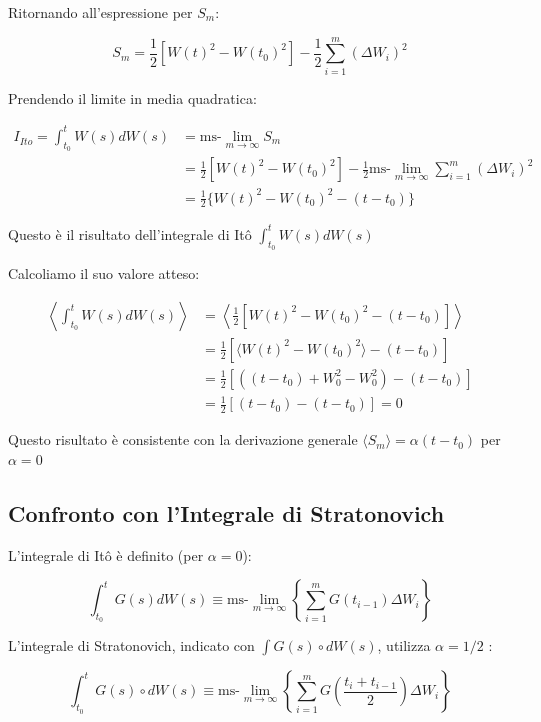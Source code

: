 Ritornando all'espressione per $S_m$:


\begin{equation}
S_m = \frac{1}{2}[W(t)^2 - W(t_0)^2] - \frac{1}{2}\sum_{i=1}^m (\Delta W_i)^2
\end{equation}


Prendendo il limite in media quadratica:


\begin{align}
I_{It\hat{o}} = \int_{t_0}^t W(s)dW(s) &= \text{ms-}\lim_{m\rightarrow\infty} S_m \nonumber \\
&= \frac{1}{2}[W(t)^2 - W(t_0)^2] - \frac{1}{2} \text{ms-}\lim_{m\rightarrow\infty} \sum_{i=1}^m (\Delta W_i)^2 \nonumber \\
&= \frac{1}{2}\{W(t)^2 - W(t_0)^2 - (t-t_0)\}
\end{align}


Questo è il risultato dell'integrale di Itô $\int_{t_0}^t W(s)dW(s)$

Calcoliamo il suo valore atteso:


\begin{align}
\left\langle \int_{t_0}^t W(s)dW(s) \right\rangle &= \left\langle \frac{1}{2}[W(t)^2 - W(t_0)^2 - (t-t_0)] \right\rangle \nonumber \\
&= \frac{1}{2} \left[ \langle W(t)^2 - W(t_0)^2 \rangle - (t-t_0) \right] \nonumber \\
&= \frac{1}{2} [ ((t-t_0)+W_0^2 - W_0^2) - (t-t_0) ] \nonumber \\
&= \frac{1}{2} [(t-t_0) - (t-t_0)] = 0
\end{align}


Questo risultato è consistente con la derivazione generale $\langle S_m \rangle = \alpha(t-t_0)$ per $\alpha=0$


\subsection{Confronto con l'Integrale di Stratonovich}
L'integrale di Itô è definito (per $\alpha=0$):


\begin{equation}
\int_{t_0}^t G(s)dW(s) \equiv \text{ms-}\lim_{m\rightarrow\infty} \left\{ \sum_{i=1}^m G(t_{i-1})\Delta W_i \right\}
\end{equation}


L'integrale di Stratonovich, indicato con $\int G(s) \circ dW(s)$, utilizza $\alpha = 1/2$ :


\begin{equation}
\int_{t_0}^t G(s)\circ dW(s) \equiv \text{ms-}\lim_{m\rightarrow\infty} \left\{ \sum_{i=1}^m G\left(\frac{t_i+t_{i-1}}{2}\right)\Delta W_i \right\}
\end{equation}


